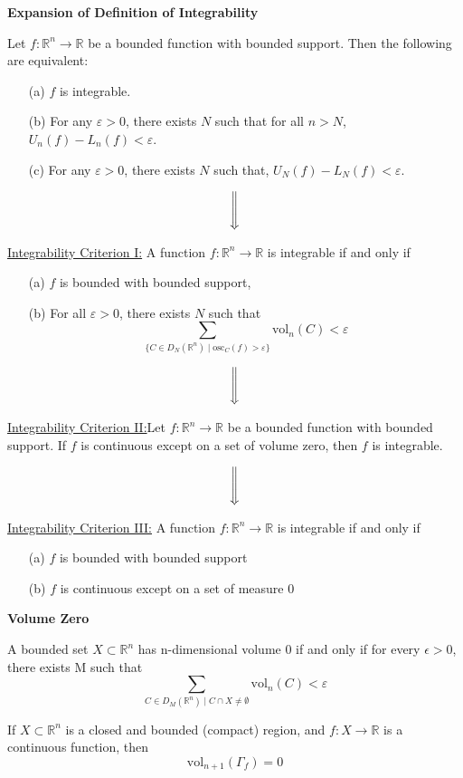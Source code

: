 \documentclass{article}
\newcommand{\R}{\mathbb{R}}
\newenvironment{definition}[1]{
    \par\noindent\textbf{#1}\par\noindent
}{
    \par \vspace{0.5cm}
}
\begin{document}
\begin{definition}{Expansion of Definition of Integrability}
    Let \( f : \R^n \to \R \) be a bounded function with bounded support. Then the following are equivalent:
    \begin{enumerate}
        \item[(a)] \( f \) is integrable.
        \item[(b)] For any \( \varepsilon > 0 \), there exists \( N \) such that for all \( n > N \),
        \( U_n(f) - L_n(f) < \varepsilon \).
        \item[(c)] For any \( \varepsilon > 0 \), there exists \( N \) such that,
        \( U_N(f) - L_N(f) < \varepsilon \).
    \end{enumerate}

    \[ \Bigg \Downarrow \]

    \underline{Integrability Criterion I:} A function \( f : \R^n \to \R \) is integrable if and only if 
    \begin{enumerate}
        \item[(a)] \( f \) is bounded with bounded support,
        \item[(b)] For all \( \varepsilon > 0 \), there exists \( N \) such that
        \[ \sum_{ \{C \in D_N(\R^n) \mid \text{osc}_C(f) > \varepsilon \} } \text{vol}_n(C) < \varepsilon \]
    \end{enumerate}

    \[ \Bigg \Downarrow \]

    \underline{Integrability Criterion II:}Let \( f : \R^n \to \R \) be a bounded function with bounded support. If \( f \) is continuous except on a set of volume zero, then \( f \) is integrable.


    \[ \Bigg \Downarrow\]

    \underline{Integrability Criterion III:} A function \( f : \R^n \to \R \) is integrable if and only if 
    \begin{enumerate}
        \item[(a)] \( f \) is bounded with bounded support
        \item[(b)] \( f \) is continuous except on a set of measure 0
    \end{enumerate}    
\end{definition}


\begin{definition}{Volume Zero}
    A bounded set \( X \subset \R^n \) has n-dimensional volume 0 if and only if for every \( \epsilon > 0 \), there exists M such that
    \[ \sum_{C \in D_M(\R^n) \mid C \cap X \neq \emptyset} \text{vol}_n(C) < \varepsilon \]

    If \( X \subset \R^n \) is a closed and bounded (compact) region, and \( f : X \to \R \) is a continuous function, then
    \[ \text{vol}_{n+1}(\Gamma_f) = 0 \]
\end{definition}
\end{document}
